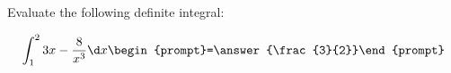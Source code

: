 \documentclass{ximera}
\author{Jim Talamo}
\begin{document}
\begin{exercise}
Evaluate the following definite integral:

\[
\int_1^2 3x-\frac{8}{x^3} \d x 
\begin{prompt}=\answer{\frac{3}{2}}\end{prompt}
\]
\end{exercise}
\end{document}
